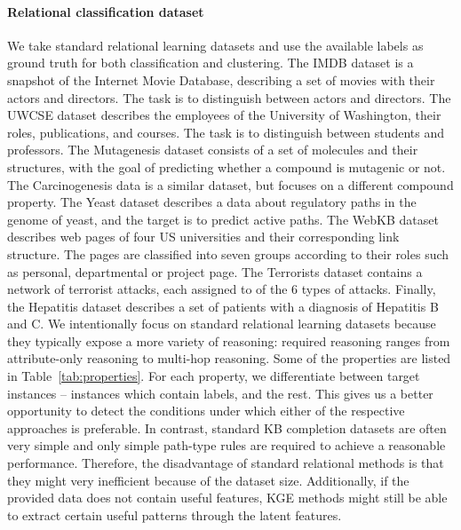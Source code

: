 \paragraph{Relational classification dataset}
We take standard relational learning datasets and use the available labels as ground truth for both classification and clustering.
The IMDB dataset is a snapshot of the Internet Movie Database, describing a set of movies with their actors and directors.
The task is to distinguish between actors and directors.
The UWCSE dataset describes the employees of the University of Washington, their roles, publications, and courses.
The task is to distinguish between students and professors.
The Mutagenesis dataset consists of a set of molecules and their structures, with the goal of predicting whether a compound is mutagenic or not.
The Carcinogenesis data is a similar dataset, but focuses on a different compound property.
The Yeast dataset describes a data about regulatory paths in the genome of yeast, and the target is to predict active paths.
The WebKB dataset describes web pages of four US universities and their corresponding link structure.
The pages are classified into seven groups according to their roles such as personal, departmental or project page.
The Terrorists dataset contains a network of terrorist attacks, each assigned to of the 6 types of attacks.
Finally, the Hepatitis dataset describes a set of patients with a diagnosis of Hepatitis B and C.
We intentionally focus on standard relational learning datasets because they typically expose a more variety of reasoning: required reasoning ranges from attribute-only reasoning to multi-hop reasoning.
Some of the properties are listed in Table~\ref{tab:properties}.
For each property, we differentiate between target instances -- instances which contain labels, and the rest.
This gives us a better opportunity to detect the conditions under which either of the respective approaches is preferable.
In contrast, standard KB completion datasets are often very simple and  only simple path-type rules are required to achieve a reasonable performance.
Therefore, the disadvantage of standard relational methods is that they might very inefficient because of the dataset size.
Additionally, if the provided data does not contain useful features, KGE methods might still be able to extract certain useful patterns through the latent features.



